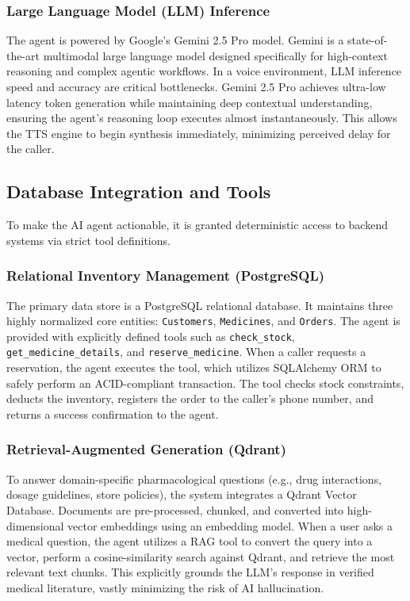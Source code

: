 \documentclass[conference,a4paper]{IEEEtran}
\begin{document}
\subsubsection{Large Language Model (LLM) Inference}
The agent is powered by Google's Gemini 2.5 Pro model. Gemini is a state-of-the-art multimodal large language model designed specifically for high-context reasoning and complex agentic workflows. In a voice environment, LLM inference speed and accuracy are critical bottlenecks. Gemini 2.5 Pro achieves ultra-low latency token generation while maintaining deep contextual understanding, ensuring the agent's reasoning loop executes almost instantaneously. This allows the TTS engine to begin synthesis immediately, minimizing perceived delay for the caller.

\subsection{Database Integration and Tools}
To make the AI agent actionable, it is granted deterministic access to backend systems via strict tool definitions.

\subsubsection{Relational Inventory Management (PostgreSQL)}
The primary data store is a PostgreSQL relational database. It maintains three highly normalized core entities: \texttt{Customers}, \texttt{Medicines}, and \texttt{Orders}. The agent is provided with explicitly defined tools such as \texttt{check\_stock}, \texttt{get\_medicine\_details}, and \texttt{reserve\_medicine}. When a caller requests a reservation, the agent executes the tool, which utilizes SQLAlchemy ORM to safely perform an ACID-compliant transaction. The tool checks stock constraints, deducts the inventory, registers the order to the caller's phone number, and returns a success confirmation to the agent.

\subsubsection{Retrieval-Augmented Generation (Qdrant)}
To answer domain-specific pharmacological questions (e.g., drug interactions, dosage guidelines, store policies), the system integrates a Qdrant Vector Database. Documents are pre-processed, chunked, and converted into high-dimensional vector embeddings using an embedding model. When a user asks a medical question, the agent utilizes a RAG tool to convert the query into a vector, perform a cosine-similarity search against Qdrant, and retrieve the most relevant text chunks. This explicitly grounds the LLM's response in verified medical literature, vastly minimizing the risk of AI hallucination.
\end{document}
